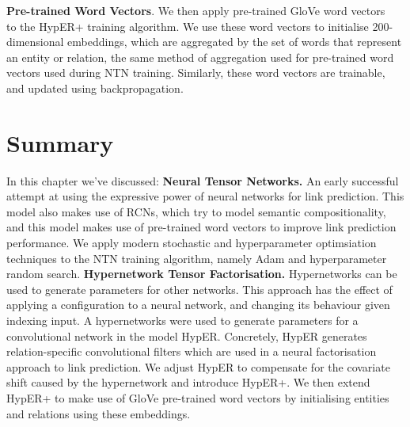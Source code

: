 \textbf{Pre-trained Word Vectors}. We then apply pre-trained GloVe word vectors ~\citep{pennington2014glove} to the HypER+ training algorithm. We use these word vectors to initialise  200-dimensional embeddings, which are aggregated by the set of words that represent an entity or relation, the same method of aggregation used for pre-trained word vectors used during NTN training. Similarly, these word vectors are trainable, and updated using backpropagation.  



\section{Summary}

In this chapter we've discussed: \newline
\textbf{Neural Tensor Networks.} An early successful attempt at using the expressive power of neural networks for link prediction. This model also makes use of RCNs, which try to model semantic compositionality, and this model makes use of pre-trained word vectors to improve link prediction performance. We apply modern stochastic and hyperparameter optimsiation techniques to the NTN training algorithm, namely Adam and hyperparameter random search. \newpage
\textbf{Hypernetwork Tensor Factorisation.}  Hypernetworks can be used to generate parameters for other networks. This approach has the effect of applying a configuration to a neural network, and changing its behaviour given indexing input. A hypernetworks were used to generate parameters for a convolutional network in the model HypER. Concretely, HypER generates relation-specific convolutional filters which are used in a neural factorisation approach to link prediction. We adjust HypER to compensate for the covariate shift caused by the hypernetwork and introduce HypER+. We then extend HypER+ to make use of GloVe pre-trained word vectors by initialising entities and relations using these embeddings. \newline
